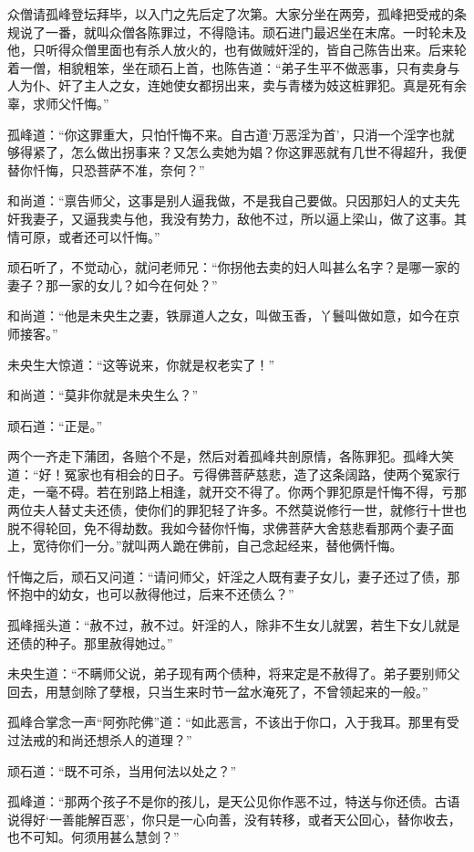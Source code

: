 \documentclass[a4paper,12pt,UTF8,twoside]{ctexbook}
\begin{document}
众僧请孤峰登坛拜毕，以入门之先后定了次第。大家分坐在两旁，孤峰把受戒的条规说了一番，就叫众僧各陈罪过，不得隐讳。顽石进门最迟坐在末席。一时轮未及他，只听得众僧里面也有杀人放火的，也有做贼奸淫的，皆自己陈告出来。后来轮着一僧，相貌粗笨，坐在顽石上首，也陈告道：“弟子生平不做恶事，只有卖身与人为仆、奸了主人之女，连她使女都拐出来，卖与青楼为妓这桩罪犯。真是死有余辜，求师父忏悔。”

孤峰道：“你这罪重大，只怕忏悔不来。自古道‘万恶淫为首’，只消一个淫字也就够得紧了，怎么做出拐事来？又怎么卖她为娼？你这罪恶就有几世不得超升，我便替你忏悔，只恐菩萨不准，奈何？”

和尚道：“禀告师父，这事是别人逼我做，不是我自己要做。只因那妇人的丈夫先奸我妻子，又逼我卖与他，我没有势力，敌他不过，所以逼上梁山，做了这事。其情可原，或者还可以忏悔。”

顽石听了，不觉动心，就问老师兄：“你拐他去卖的妇人叫甚么名字？是哪一家的妻子？那一家的女儿？如今在何处？”

和尚道：“他是未央生之妻，铁扉道人之女，叫做玉香，丫鬟叫做如意，如今在京师接客。”

未央生大惊道：“这等说来，你就是权老实了！”

和尚道：“莫非你就是未央生么？”

顽石道：“正是。”

两个一齐走下蒲团，各赔个不是，然后对着孤峰共剖原情，各陈罪犯。孤峰大笑道：“好！冤家也有相会的日子。亏得佛菩萨慈悲，造了这条阔路，使两个冤家行走，一毫不碍。若在别路上相逢，就开交不得了。你两个罪犯原是忏悔不得，亏那两位夫人替丈夫还债，使你们的罪犯轻了许多。不然莫说修行一世，就修行十世也脱不得轮回，免不得劫数。我如今替你忏悔，求佛菩萨大舍慈悲看那两个妻子面上，宽待你们一分。”就叫两人跪在佛前，自己念起经来，替他俩忏悔。

忏悔之后，顽石又问道：“请问师父，奸淫之人既有妻子女儿，妻子还过了债，那怀抱中的幼女，也可以赦得他过，后来不还债么？”

孤峰摇头道：“赦不过，赦不过。奸淫的人，除非不生女儿就罢，若生下女儿就是还债的种子。那里赦得她过。”

未央生道：“不瞒师父说，弟子现有两个债种，将来定是不赦得了。弟子要别师父回去，用慧剑除了孽根，只当生来时节一盆水淹死了，不曾领起来的一般。”

孤峰合掌念一声“阿弥陀佛”道：“如此恶言，不该出于你口，入于我耳。那里有受过法戒的和尚还想杀人的道理？”

顽石道：“既不可杀，当用何法以处之？”

孤峰道：“那两个孩子不是你的孩儿，是天公见你作恶不过，特送与你还债。古语说得好‘一善能解百恶’，你只是一心向善，没有转移，或者天公回心，替你收去，也不可知。何须用甚么慧剑？”
\end{document}
